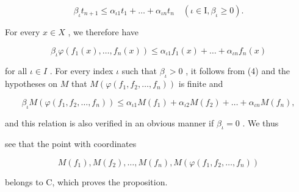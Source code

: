 \[
\beta_ {\iota} t _ {n + 1} \leqslant \alpha_ {\iota 1} t _ {1} + \dots + \alpha_ {\iota n} t _ {n} \quad (\iota \in \mathrm{I}, \beta_ {\iota} \geqslant 0).\tag{3}
\]

For every \(x \in X\) , we therefore have

\[
\beta_ {\iota} \varphi (f _ {1} (x), \dots , f _ {n} (x)) \leqslant \alpha_ {\iota 1} f _ {1} (x) + \dots + \alpha_ {\iota n} f _ {n} (x)\tag{4}
\]

for all \(\iota \in I\) . For every index \(\iota\) such that \(\beta_{\iota} > 0\) , it follows from (4) and the hypotheses on \(M\) that \(M(\varphi(f_1, f_2, \ldots, f_n))\) is finite and

\[
\beta_ {\iota} M \left(\varphi \left(f _ {1}, f _ {2}, \dots , f _ {n}\right)\right) \leqslant \alpha_ {\iota 1} M \left(f _ {1}\right) + \alpha_ {\iota 2} M \left(f _ {2}\right) + \dots + \alpha_ {\iota n} M \left(f _ {n}\right),
\]

and this relation is also verified in an obvious manner if \(\beta_{\iota} = 0\) . We thus

see that the point with coordinates

\[
M (f _ {1}), M (f _ {2}), \dots , M (f _ {n}), M (\varphi (f _ {1}, f _ {2}, \dots , f _ {n}))
\]

belongs to C, which proves the proposition.

